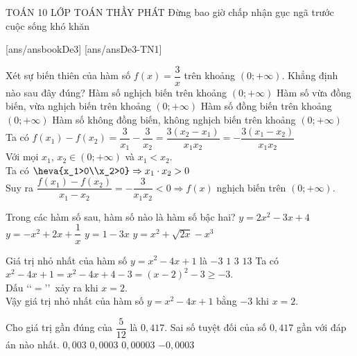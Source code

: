 \begin{name}
	{\tenchude}
	{TOÁN 10}
	{LỚP TOÁN THẦY PHÁT}
	{Đừng bao giờ chấp nhận gục ngã trước cuộc sống khó khăn}
\end{name}
[ans/ansbookDe3]
\TN
{}[ans/ansDe3-TN1]
\begin{ex}%
	Xét sự biến thiên của hàm số $f(x)=\dfrac{3}{x}$ trên khoảng $(0 ;+\infty)$. Khẳng định nào sau đây đúng?
	\choice
	{\True Hàm số nghịch biến trên khoảng $(0 ;+\infty)$}
	{ Hàm số vừa đồng biến, vừa nghịch biến trên khoảng $(0 ;+\infty)$}
	{Hàm số đồng biến trên khoảng $(0 ;+\infty)$}
	{Hàm số không đồng biến, không nghịch biến trên khoảng $(0 ;+\infty)$}
	\loigiai
	{
		Ta có $f(x_1)-f(x_2)=\dfrac{3}{x_1}-\dfrac{3}{x_2}=\dfrac{3(x_2-x_1)}{x_1x_2}=-\dfrac{3(x_1-x_2)}{x_1x_2}$\\
		Với mọi $x_1$, $x_2\in (0 ;+\infty) $ và $x_1 < x_2$.\\
		Ta có $ \heva{x_1>0\\x_2>0} \Rightarrow x_1 \cdot x_2 >0$\\
		Suy ra $ \dfrac{f(x_1)-f(x_2)}{x_1-x_2}=-\dfrac{3}{x_1x_2}<0 \Rightarrow f(x)$ nghịch biến trên $(0 ;+\infty)$.
	}
\end{ex}

\begin{ex}%
	Trong các hàm số sau, hàm số nào là hàm số bậc hai?
	\choice
	{\True $y=2x^2-3x+4$}
	{$y=-x^2+2x+\dfrac{1}{x}$}
	{$y=1-3x$}
	{$y=x^2+\sqrt{2x}-x^3$}
\end{ex}

\begin{ex}%
	Giá trị nhỏ nhất của hàm số $y=x^2-4x+1$ là
	\choice
	{\True $-3$}
	{$1$}
	{$3$}
	{$13$}
	\loigiai
	{
		Ta có $x^2-4x+1=x^2-4x+4-3=(x-2)^2-3\geqslant-3$. \\
		Dấu \lq\lq$=$\rq\rq\ xảy ra khi $x=2$. \\
		Vậy giá trị nhỏ nhất của hàm số $y=x^2-4x+1$ bằng $-3$ khi $x=2$.
	}
\end{ex}

\begin{ex}%
	Cho giá trị gần đúng của $\dfrac{5}{12}$ là $0{,}417$. Sai số tuyệt đối của số $0{,}417$ gần với đáp án nào nhất.
	\choice
	{$0{,}003$}
	{\True $0{,}0003$}
	{$0{,}00003$}
	{$-0{,}0003$}
\end{ex}

